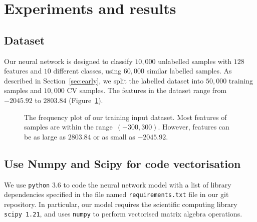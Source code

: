 \section{Experiments and results}\label{chapter4}

\subsection{Dataset}

Our neural network is designed to classify $10,000$ unlabelled samples with $128$ features and $10$ different classes, using $60,000$ similar labelled samples. As described in Section~\ref{sec:early}, we split the labelled dataset into $50,000$ training samples and $10,000$ CV samples. The features in the dataset range from $-2045.92$ to $2803.84$ (Figure~\ref{fig:freq-hist}).
\begin{figure}
    \caption{The frequency plot of our training input dataset. Most features of samples are within the range~$(-300,300)$. However, features can be as large as $2803.84$ or as small as $-2045.92$.}
    \label{fig:freq-hist}
\end{figure}

\subsection{Use Numpy and Scipy for code vectorisation}
We use \texttt{python} 3.6 to code the neural network model with a list of library dependencies specified in the file named \texttt{requirements.txt} file in our git repository. 
In particular, our model requires the scientific computing library \texttt{scipy 1.21}, and uses \texttt{numpy} to perform vectorised matrix algebra operations.

